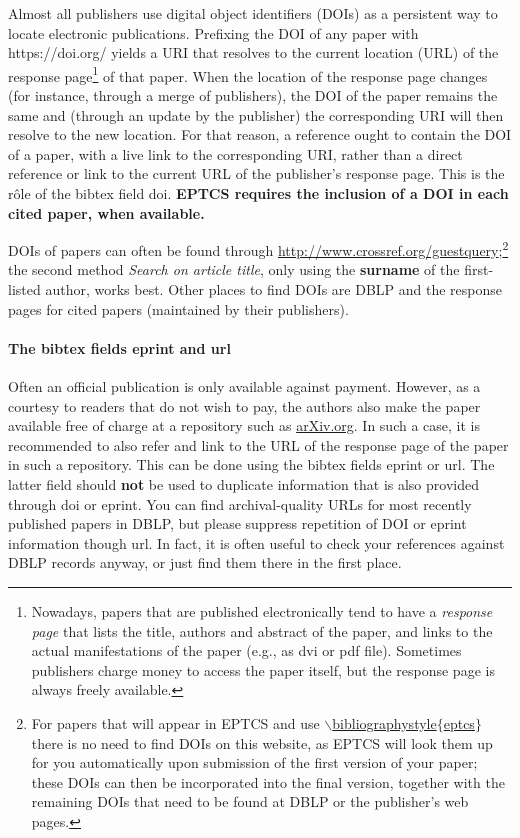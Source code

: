 \documentclass[submission,copyright,creativecommons]{eptcs}
\begin{document}
Almost all publishers use digital object identifiers (DOIs) as a
persistent way to locate electronic publications. Prefixing the DOI of
any paper with {\ttfamily https://doi.org/} yields a URI that resolves to the
current location (URL) of the response page\footnote{Nowadays, papers
  that are published electronically tend
  to have a \emph{response page} that lists the title, authors and
  abstract of the paper, and links to the actual manifestations of
  the paper (e.g., as {\ttfamily dvi} or {\ttfamily pdf} file). Sometimes
  publishers charge money to access the paper itself, but the response
  page is always freely available.}
of that paper. When the location of the response page changes (for
instance, through a merge of publishers), the DOI of the paper remains
the same and (through an update by the publisher) the corresponding
URI will then resolve to the new location. For that reason, a reference
ought to contain the DOI of a paper, with a live link to the corresponding
URI, rather than a direct reference or link to the current URL of the
publisher's response page. This is the r\^ole of the bibtex field {\ttfamily doi}.
{\bfseries EPTCS requires the inclusion of a DOI in each cited paper, when available.}

DOIs of papers can often be found through
\url{http://www.crossref.org/guestquery};\footnote{For papers that will appear
  in EPTCS and use \href{http://eptcs.web.cse.unsw.edu.au/eptcs.bst}
  {\ttfamily $\backslash$bibliographystyle$\{$eptcs$\}$} there is no need to
  find DOIs on this website, as EPTCS will look them up for you
  automatically upon submission of the first version of your paper;
  these DOIs can then be incorporated into the final version, together
  with the remaining DOIs that need to be found at DBLP or the publisher's web pages.}
the second method {\itshape Search on article title}, only using the {\bfseries
surname} of the first-listed author, works best.
Other places to find DOIs are DBLP and the response pages for cited
papers (maintained by their publishers).

\paragraph{The bibtex fields {\ttfamily eprint} and {\ttfamily url}}

Often an official publication is only available against payment. However,
as a courtesy to readers that do not wish to pay, the authors also
make the paper available free of charge at a repository such as
\url{arXiv.org}. In such a case, it is recommended to also refer and
link to the URL of the response page of the paper in such a
repository.  This can be done using the bibtex fields {\ttfamily eprint}
or {\ttfamily url}.  The latter field should \textbf{not} be used
to duplicate information that is also provided through {\ttfamily doi} or {\ttfamily eprint}.
You can find archival-quality URLs for most recently published papers
in DBLP, but please suppress repetition of DOI or {\ttfamily eprint} information though {\ttfamily url}.
In fact, it is often useful to check your references against DBLP records anyway,
or just find them there in the first place.
\end{document}
